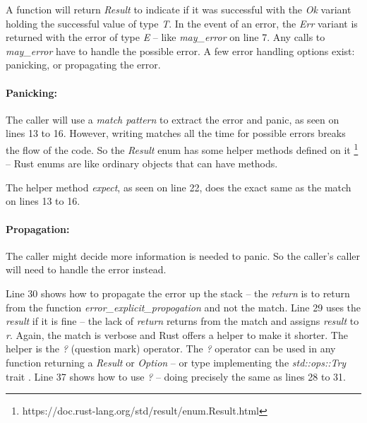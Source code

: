 A function will return \textit{Result} to indicate if it was successful with the \textit{Ok} variant holding the successful value of type \textit{T}.
In the event of an error, the \textit{Err} variant is returned with the error of type \textit{E} -- like \textit{may\_error} on line 7.
Any calls to \textit{may\_error} have to handle the possible error.
A few error handling options exist: panicking, or propagating the error.

\paragraph{Panicking:}
The caller will use a \textit{match pattern} to extract the error and panic, as seen on lines 13 to 16.
However, writing matches all the time for possible errors breaks the flow of the code.
So the \textit{Result} enum has some helper methods defined on it \footnote{https://doc.rust-lang.org/std/result/enum.Result.html} -- Rust enums are like ordinary objects that can have methods.

The helper method \textit{expect}, as seen on line 22, does the exact same as the match on lines 13 to 16.

\paragraph{Propagation:}
The caller might decide more information is needed to panic.
So the caller's caller will need to handle the error instead.

Line 30 shows how to propagate the error up the stack -- the \textit{return} is to return from the function \textit{error\_explicit\_propogation} and not the match.
Line 29 uses the \textit{result} if it is fine -- the lack of \textit{return} returns from the match and assigns \textit{result} to \textit{r}.
Again, the match is verbose and Rust offers a helper to make it shorter.
The helper is the \textit{?} (question mark) operator.
The \textit{?} operator can be used in any function returning a \textit{Result} or \textit{Option} -- or type implementing the \textit{std::ops::Try} trait \cite{klabnik_2019_01}.
Line 37 shows how to use \textit{?} -- doing precisely the same as lines 28 to 31.


